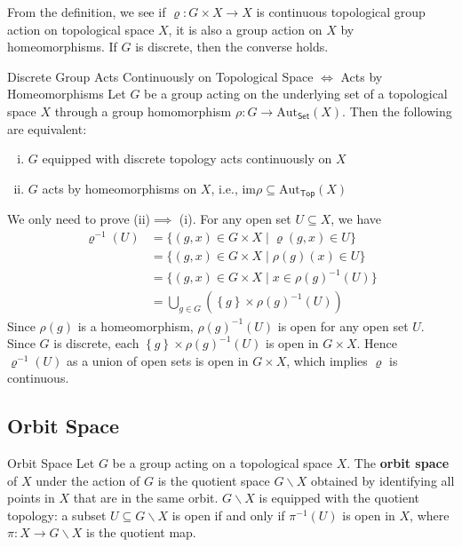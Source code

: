 \documentclass{report}
\begin{document}
From the definition, we see if $\varrho:G\times X\to X$ is continuous topological group action on topological space $X$, it is also a group action on $X$ by homeomorphisms. If $G$ is discrete, then the converse holds.

\begin{proposition}{Discrete Group Acts Continuously on Topological Space $\iff$ Acts by Homeomorphisms}{}
	Let $G$ be a group acting on the underlying set of a topological space $X$ through a group homomorphism $\rho:G\to \mathrm{Aut}_{\mathsf{Set}}(X)$. Then the following are equivalent:
	\begin{enumerate}[(i)]
		\item $G$ equipped with discrete topology acts continuously on $X$
		\item $G$ acts by homeomorphisms on $X$, i.e.,
		      $\mathrm{im}\rho \subseteq \mathrm{Aut}_{\mathsf{Top}}(X)$
	\end{enumerate}
\end{proposition}
\begin{prf}
	We only need to prove (ii)$\implies$ (i). For any open set $U\subseteq X$, we have
	\begin{align*}
		\varrho^{-1}(U) & =\{(g,x)\in G\times X\mid \varrho(g,x)\in U\}                         \\
		                & =\{(g,x)\in G\times X\mid \rho(g)(x)\in U\}                           \\
		                & =\{(g,x)\in G\times X\mid x\in \rho(g)^{-1}(U)\}                      \\
		                & =\bigcup_{g\in G}\left(\left\{g\right\}\times \rho(g)^{-1}(U) \right)
	\end{align*}
	Since $\rho(g)$ is a homeomorphism, $\rho(g)^{-1}(U)$ is open for any open set $U$. Since $G$ is discrete,  each $\left\{g\right\}\times \rho(g)^{-1}(U)$ is open in $G\times X$. Hence $\varrho^{-1}(U)$ as a union of open sets is open in $G\times X$, which implies $\varrho$ is continuous.
\end{prf}

\subsection{Orbit Space}

\begin{definition}{Orbit Space}{}
	Let $G$ be a group acting on a topological space $X$. The \textbf{orbit space} of $X$ under the action of $G$ is the quotient space $G\backslash X $ obtained by identifying all points in $X$ that are in the same orbit. $G\backslash X $ is equipped with the quotient topology: a subset $U\subseteq G\backslash X $ is open if and only if $\pi^{-1}(U)$ is open in $X$, where $\pi:X\to  G\backslash X$ is the quotient map.
\end{definition}
\end{document}
